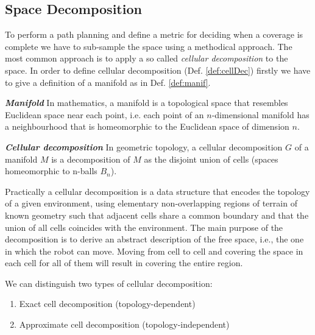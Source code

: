 \subsection{Space Decomposition}
\label{sec:spaceDec}

To perform a path planning and define a metric for deciding when a coverage is complete we have to sub-sample the space using a methodical approach. The most common approach is to apply a so called \emph{cellular decomposition} to the space. In order to define cellular decomposition (Def. \ref{def:cellDec}) firstly we have to give a definition of a manifold as in Def. \ref{def:manif}.

\theoremstyle{definition}
\begin{definition}{\textbf{\textit{Manifold}}}\label{def:manif}
In mathematics, a manifold is a topological space that resembles Euclidean space near each point, i.e. each point of an $n$-dimensional manifold has a neighbourhood that is homeomorphic to the Euclidean space of dimension $n$.
\end{definition}

\theoremstyle{definition}
\begin{definition}{\textbf{\textit{Cellular decomposition}}}\label{def:cellDec}
In geometric topology, a cellular decomposition $G$ of a manifold $M$ is a decomposition of $M$ as the disjoint union of cells (spaces homeomorphic to n-balls $B_n$).
\end{definition}

Practically a cellular decomposition is a data structure that encodes the topology of a given environment, using elementary non-overlapping regions of terrain of known geometry such that adjacent cells share a common boundary and that the union of all cells coincides with the environment. The main purpose of the decomposition is to derive an abstract description of the free space, i.e., the one in which the robot can move. Moving from cell to cell and covering the space in each cell for all of them will result in covering the entire region.

\noindent We can distinguish two types of cellular decomposition:
\begin{enumerate}
\item Exact cell decomposition (topology-dependent)
\item Approximate cell decomposition (topology-independent)
\end{enumerate}

